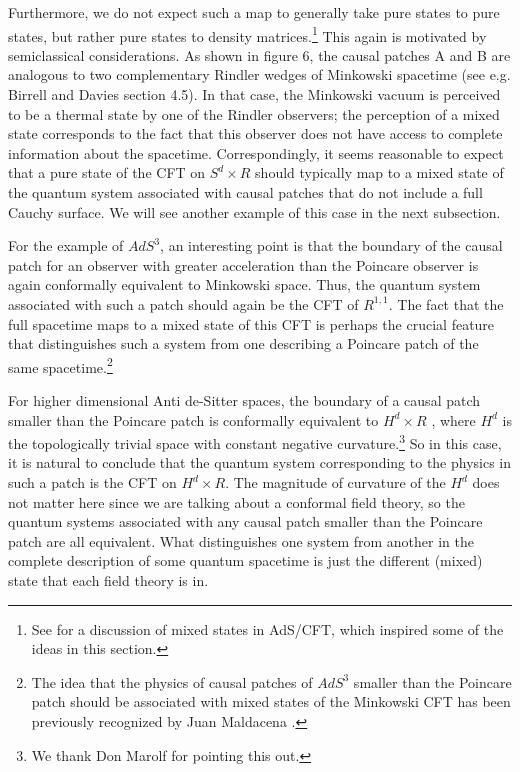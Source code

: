 \documentclass[12pt,epsf]{article}
\renewcommand{\(}{\left(}
\renewcommand{\)}{\right)}
\begin{document}
Furthermore, we do not expect such a map to generally take pure states to pure states, but rather pure states to density matrices.\footnote{See \cite{fhmmrs} for a discussion of mixed states in AdS/CFT, which inspired some of the ideas in this section.} This again is motivated by semiclassical considerations. As shown in figure 6, the causal patches A and B are analogous to two complementary Rindler wedges of Minkowski spacetime (see e.g. Birrell and Davies section 4.5). In that case, the Minkowski vacuum is perceived to be a thermal state by one of the Rindler observers; the perception of a mixed state corresponds to the fact that this observer does not have access to complete information about the spacetime. Correspondingly, it seems reasonable to expect that a pure state of the CFT on $S^d \times R$ should typically map to a mixed state of the quantum system associated with causal patches that do not include a full Cauchy surface. We will see another example of this case in the next subsection.

For the example of $AdS^3$, an interesting point is that the boundary of the causal patch for an observer with greater acceleration than the Poincare observer is again conformally equivalent to Minkowski space. Thus, the quantum system associated with such a patch should again be the CFT of $R^{1,1}$. The fact that the full spacetime maps to a mixed state of this CFT is perhaps the crucial feature that distinguishes such a system from one describing a Poincare patch of the same spacetime.\footnote{The idea that the physics of causal patches of $AdS^3$ smaller than the Poincare patch should be associated with mixed states of the Minkowski CFT has been previously recognized by Juan Maldacena \cite{juan}.}

For higher dimensional Anti de-Sitter spaces, the boundary of a causal patch smaller than the Poincare patch is conformally equivalent to $H^d \times R$ \cite{hls}, where $H^d$ is the topologically trivial space with constant negative curvature.\footnote{We thank Don Marolf for pointing this out.} So in this case, it is natural to conclude that the quantum system corresponding to the physics in such a patch is the CFT on $H^d \times R$. The magnitude of curvature of the $H^d$ does not matter here since we are talking about a conformal field theory, so the quantum systems associated with any causal patch smaller than the Poincare patch are all equivalent. What distinguishes one system from another in the complete description of some quantum spacetime is just the different (mixed) state that each field theory is in.
\end{document}
